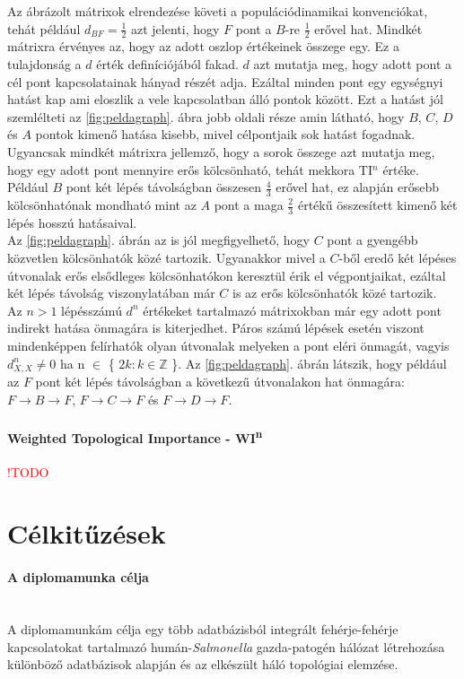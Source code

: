 \documentclass[a4paper,12pt]{article}
\begin{document}
	Az ábrázolt mátrixok elrendezése követi a populációdinamikai konvenciókat, tehát például $d_{BF}=\frac{1}{2}$ azt jelenti, hogy $F$ pont a $B$-re $\frac{1}{2}$ erővel hat. Mindkét mátrixra érvényes az, hogy az adott oszlop értékeinek összege egy. Ez a tulajdonság a $d$ érték definíciójából fakad. $d$ azt mutatja meg, hogy adott pont a cél pont kapcsolatainak hányad részét adja. Ezáltal minden pont egy egységnyi hatást kap ami eloszlik a vele kapcsolatban álló pontok között. \cite{ti} Ezt a hatást jól szemlélteti az \ref{fig:peldagraph}. ábra jobb oldali része amin látható, hogy $B$, $C$, $D$ és $A$ pontok kimenő hatása kisebb, mivel célpontjaik sok hatást fogadnak. \\
	\indent Ugyancsak mindkét mátrixra jellemző, hogy a sorok összege azt mutatja meg, hogy egy adott pont mennyire erős kölcsönható, tehát mekkora TI$^n$ értéke. Például $B$ pont két lépés távolságban összesen $\frac{4}{3}$ erővel hat, ez alapján erősebb kölcsönhatónak mondható mint az $A$ pont a maga $\frac{2}{3}$ értékű összesített kimenő két lépés hosszú hatásaival. \cite{ti} \\
	\indent Az \ref{fig:peldagraph}. ábrán az is jól megfigyelhető, hogy $C$ pont a gyengébb közvetlen kölcsönhatók közé tartozik. Ugyanakkor mivel a $C$-ből eredő két lépéses útvonalak erős elsődleges kölcsönhatókon keresztül érik el végpontjaikat, ezáltal két lépés távolság viszonylatában már $C$ is az erős kölcsönhatók közé tartozik. \\
	\indent Az $n > 1$ lépésszámú $d^n$ értékeket tartalmazó mátrixokban már egy adott pont indirekt hatása önmagára is kiterjedhet. Páros számú lépések esetén viszont mindenképpen felírhatók olyan útvonalak melyeken a pont eléri önmagát, \cite{ti} vagyis $d^n_{X,X} \neq 0$ ha n $\in$ \{ $2k :  k \in \mathbb{Z}$ \}. Az \ref{fig:peldagraph}. ábrán látszik, hogy például az $F$ pont két lépés távolságban a következű útvonalakon hat önmagára: $F \rightarrow B \rightarrow F$, $F \rightarrow C \rightarrow F$ és  $F \rightarrow D \rightarrow F$.
	
 	 \paragraph{Weighted Topological Importance - WI\textsuperscript{n}} \textcolor{red}{ !TODO}

\section{Célkitűzések}
	\paragraph{A diplomamunka célja} \mbox{}\\
	A diplomamunkám célja egy több adatbázisból integrált fehérje-fehérje kapcsolatokat tartalmazó humán-\textit{Salmonella} gazda-patogén hálózat létrehozása különböző adatbázisok alapján és az elkészült háló topológiai elemzése.
	
\end{document}

